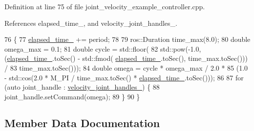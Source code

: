 Definition at line 75 of file joint\+\_\+velocity\+\_\+example\+\_\+controller.\+cpp.



References elapsed\+\_\+time\+\_\+, and velocity\+\_\+joint\+\_\+handles\+\_\+.


\begin{DoxyCode}
76                                                                        \{
77   \hyperlink{classfranka__example__controllers_1_1JointVelocityExampleController_a39a8d082e948e285156244f678b8e627}{elapsed\_time\_} += period;
78 
79   ros::Duration time\_max(8.0);
80   \textcolor{keywordtype}{double} omega\_max = 0.1;
81   \textcolor{keywordtype}{double} cycle = std::floor(
82       std::pow(-1.0, (\hyperlink{classfranka__example__controllers_1_1JointVelocityExampleController_a39a8d082e948e285156244f678b8e627}{elapsed\_time\_}.toSec() - std::fmod(
      \hyperlink{classfranka__example__controllers_1_1JointVelocityExampleController_a39a8d082e948e285156244f678b8e627}{elapsed\_time\_}.toSec(), time\_max.toSec())) /
83                          time\_max.toSec()));
84   \textcolor{keywordtype}{double} omega = cycle * omega\_max / 2.0 *
85                  (1.0 - std::cos(2.0 * M\_PI / time\_max.toSec() * \hyperlink{classfranka__example__controllers_1_1JointVelocityExampleController_a39a8d082e948e285156244f678b8e627}{elapsed\_time\_}.toSec()));
86 
87   \textcolor{keywordflow}{for} (\textcolor{keyword}{auto} joint\_handle : \hyperlink{classfranka__example__controllers_1_1JointVelocityExampleController_ab88c025c1a93924c079416fe2dbe011e}{velocity\_joint\_handles\_}) \{
88     joint\_handle.setCommand(omega);
89   \}
90 \}
\end{DoxyCode}


\subsection{Member Data Documentation}
\mbox{\label{classfranka__example__controllers_1_1JointVelocityExampleController_a39a8d082e948e285156244f678b8e627}} 
